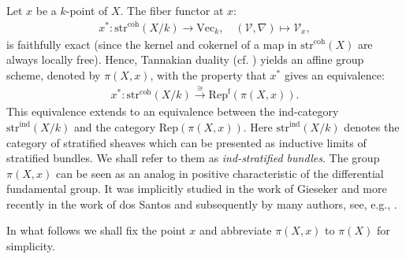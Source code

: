 \documentclass[12pt,a4]{amsart}
\theoremstyle{definition}
\begin{document}
Let $x$ be a $k$-point of $X$. The fiber functor at $x:$  
\begin{align*}
 x^*:   \mathrm{str}^\mathrm{coh}(X/k) \longrightarrow \mathrm{Vec}_k,\quad 
    (\mathcal{V}, \nabla) \mapsto \mathcal{V}_{x},
\end{align*}
is faithfully exact (since the kernel and cokernel of a map in $\mathrm{str}^\mathrm{coh}(X)$
are always locally free). Hence,
Tannakian duality (cf. \cite[Theorem 2.11]{DM82})  yields an affine group
scheme, denoted by $\pi(X,x)$, with the property that $x^*$ gives an equivalence:
\begin{align}\label{eq_tannakian_equiv}
 x^*:   \mathrm{str}^\mathrm{coh}(X/k) \overset{\cong}{\longrightarrow} 
 \mathrm{Rep}^\mathrm{f}(\pi(X,x)).
\end{align} 
This equivalence extends to an equivalence between the ind-category 
$\mathrm{str}^\mathrm{ind}(X/k)$ and the category $\mathrm{Rep}(\pi(X,x))$.
Here  $\mathrm{str}^\mathrm{ind}(X/k)$ denotes the category of stratified sheaves
which can be presented as inductive limits of stratified bundles. We shall refer to
them as \textit{ind-stratified bundles}. The group $\pi(X,x)$ can be seen
as an analog in positive characteristic of the differential fundamental group. It was 
implicitly studied in the work  \cite{Gie75} of Gieseker and more recently in the work
of dos Santos \cite{dSa07} and subsequently by many authors, see, e.g., 
\cite{EM10, Kin15,ESB16,vdP19, Sun19}. 

In what follows we shall fix the point $x$
and abbreviate $\pi(X,x)$ to $\pi(X)$ for simplicity. 
\end{document}
